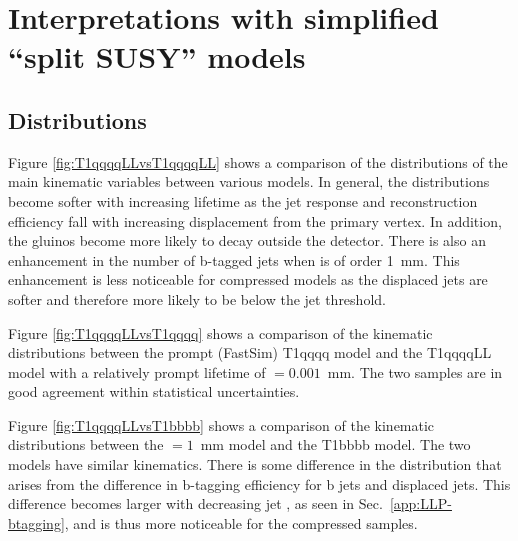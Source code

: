 \section{Interpretations with simplified ``split SUSY'' models}
\label{app:LLP}

\subsection{Distributions}
\label{app:LLP-distributions}

Figure \ref{fig:T1qqqqLLvsT1qqqqLL} shows a comparison of the distributions of 
the main kinematic variables between various \ctau models. In general, the
distributions become softer with increasing lifetime as the jet response and
reconstruction efficiency fall with increasing displacement from the primary
vertex. In addition, the gluinos become more likely to decay outside the detector.
There is also an enhancement in the number of b-tagged jets when \ctau
is of order 1~mm. This enhancement is less noticeable for compressed models
as the displaced jets are softer and therefore more likely to be below the jet 
\pt threshold.

Figure \ref{fig:T1qqqqLLvsT1qqqq} shows a comparison of the kinematic
distributions between the prompt (FastSim) T1qqqq model and the
T1qqqqLL model with a relatively prompt lifetime of \ctau$=0.001$~mm. The two
samples are in good agreement within statistical uncertainties.

Figure \ref{fig:T1qqqqLLvsT1bbbb} shows a comparison of the kinematic
distributions between the \ctau$=1$~mm model and the T1bbbb model. The two
models have similar kinematics. There is some difference in the \nb distribution
that arises from the difference in b-tagging efficiency for b jets and
displaced jets. This difference becomes larger with decreasing jet \pt, as
seen in Sec.~\ref{app:LLP-btagging}, and is thus more noticeable
for the compressed samples.

